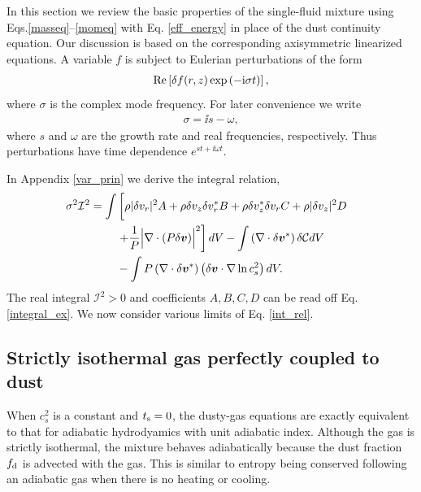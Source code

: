 In this section we review the basic properties of the 
single-fluid mixture using Eqs.\ref{masseq}--\ref{momeq} with 
Eq. \ref{eff_energy} in place of the dust continuity equation. Our
discussion is based on the corresponding axisymmetric linearized
equations. A variable $f$ is
subject to Eulerian perturbations of the form 
\begin{align}
 \operatorname{Re}\left[ \delta f(r,z)\exp{\left(-\mathrm{i}\sigma t\right)}\right], 
\end{align}
where $\sigma$ is the complex mode frequency. For later convenience we
write 
\begin{align}
  \sigma = \ii s - \omega,
\end{align}
where $s$ and $\omega$ are the growth rate and real frequencies,
respectively. Thus perturbations have time dependence $e^{st +
  \ii\omega t}$.  

In Appendix
\ref{var_prin} we derive the integral relation,  
\begin{align}
  \sigma^2\mathcal{I}^2
&= \int\left[ \rho
  |\dd v_r|^2A + \rho  \dd v_z \dd v_r^* B + \rho \dd v_z^*\dd v_r C +
  \rho |\dd v_z|^2 D\phantom{\frac{1}{1}}\right. \notag\\
&\phantom{===}  \left. + \frac{1}{P}\Bigl\lvert \nabla\cdot\left(P\dd
  \bm{v}\right)\Bigr\rvert^2\right]dV  -\int \left(\nabla\cdot\dd\bm{v}^*\right)\dd\mathcal{C}dV \notag\\
&\phantom{===}
- \int P
  \left(\nabla\cdot\dd\bm{v}^*\right)\left(\dd\bm{v}\cdot\nabla\ln{c_s^2}\right)dV.\label{int_rel}
\end{align} 
The real integral $\mathcal{I}^2>0$ and coefficients $A,B,C,D$ can be
read off Eq. \ref{integral_ex}. %
We now consider various limits of Eq. \ref{int_rel}.    


\subsection{Strictly isothermal gas perfectly coupled to dust}\label{iso_perfect}
When $c_s^2$ is a constant and $t_\mathrm{s}=0$, the dusty-gas equations are
exactly equivalent to that for adiabatic hydrodyamics with unit adiabatic
index. Although the gas is strictly isothermal, the mixture behaves 
adiabatically because the dust fraction $f_\mathrm{d}$ is advected with 
the gas. This is similar to entropy being conserved following an
adiabatic gas when there is no heating or cooling.  


